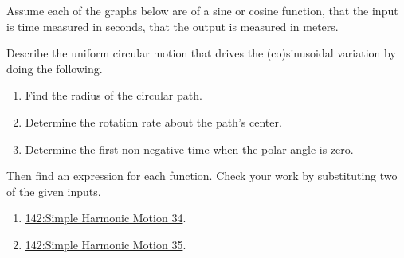 \documentclass{ximera}
\begin{document}
\begin{exercise} \label{ELDKFeef}
Assume each of the graphs below are of a sine or cosine function, that the input is time measured in seconds, that the output is measured in meters.

Describe the uniform circular motion that drives the (co)sinusoidal variation by doing the following.
 
\begin{enumerate}
\item Find the radius of the circular path.

\item Determine the rotation rate about the path's center.

\item Determine the first non-negative time when the polar angle is zero.

\end{enumerate}

Then find an expression for each function. Check your work by substituting two of the given inputs.


\begin{enumerate}

\item 

\href{https://www.desmos.com/calculator/o37ufo2ev5}{142:Simple Harmonic Motion 34}.

 
\begin{onlineOnly}
    \begin{center}
\end{center}
\end{onlineOnly}


\item 

\href{https://www.desmos.com/calculator/3t8bev0ify}{142:Simple Harmonic Motion 35}.

 
\begin{onlineOnly}
    \begin{center}
\end{center}
\end{onlineOnly}



\end{enumerate}

 


\end{exercise}
\end{document}
